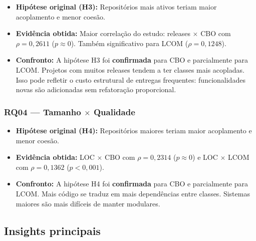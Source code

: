 \documentclass[12pt,a4paper]{article}
\begin{document}
\begin{itemize}
    \item \textbf{Hipótese original (H3):} Repositórios mais ativos teriam maior acoplamento e menor coesão.
    \item \textbf{Evidência obtida:} Maior correlação do estudo: releases $\times$ CBO com $\rho = 0{,}2611$ ($p \approx 0$). Também significativo para LCOM ($\rho = 0{,}1248$).
    \item \textbf{Confronto:} A hipótese H3 foi \textbf{confirmada} para CBO e parcialmente para LCOM. Projetos com muitos releases tendem a ter classes mais acopladas. Isso pode refletir o custo estrutural de entregas frequentes: funcionalidades novas são adicionadas sem refatoração proporcional.
\end{itemize}

\subsubsection{RQ04 — Tamanho $\times$ Qualidade}

\begin{itemize}
    \item \textbf{Hipótese original (H4):} Repositórios maiores teriam maior acoplamento e menor coesão.
    \item \textbf{Evidência obtida:} LOC $\times$ CBO com $\rho = 0{,}2314$ ($p \approx 0$) e LOC $\times$ LCOM com $\rho = 0{,}1362$ ($p < 0{,}001$).
    \item \textbf{Confronto:} A hipótese H4 foi \textbf{confirmada} para CBO e parcialmente para LCOM. Mais código se traduz em mais dependências entre classes. Sistemas maiores são mais difíceis de manter modulares.
\end{itemize}

\subsection{Insights principais}
\end{document}
